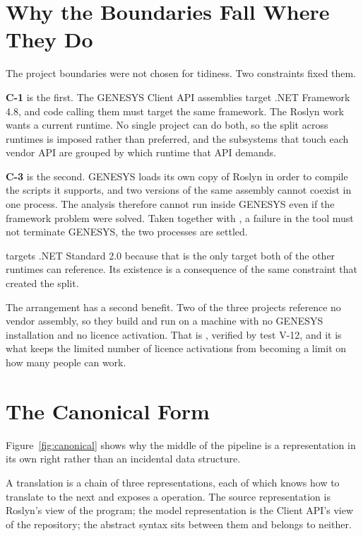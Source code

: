 \section{Why the Boundaries Fall Where They Do}

The project boundaries were not chosen for tidiness. Two constraints fixed them.

\textbf{C-1} is the first. The GENESYS Client API assemblies target .NET
Framework 4.8, and code calling them must target the same framework. The Roslyn
work wants a current runtime. No single project can do both, so the split across
runtimes is imposed rather than preferred, and the subsystems that touch each
vendor API are grouped by which runtime that API demands.

\textbf{C-3} is the second. GENESYS loads its own copy of Roslyn in order to
compile the scripts it supports, and two versions of the same assembly cannot
coexist in one process. The analysis therefore cannot run inside GENESYS even if
the framework problem were solved. Taken together with , a failure in
the tool must not terminate GENESYS, the two processes are settled.

 targets .NET Standard 2.0 because that is the only
target both of the other runtimes can reference. Its existence is a consequence
of the same constraint that created the split.

The arrangement has a second benefit. Two of the three projects reference no
vendor assembly, so they build and run on a
machine with no GENESYS installation and no licence activation. That is
, verified by test V-12, and it is what keeps the limited number of
licence activations from becoming a limit on how many people can work.

\section{The Canonical Form}
\label{sec:canonical}


Figure~\ref{fig:canonical} shows why the middle of the pipeline is a
representation in its own right rather than an incidental data structure.

A translation is a chain of three representations, each of which knows how to
translate to the next and exposes a  operation. The source
representation is Roslyn's view of the program; the model representation is the
Client API's view of the repository; the abstract syntax sits between them and
belongs to neither.

